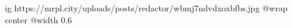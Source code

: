  
 
 
 
 

\ifcmt
  ig https://mrpl.city/uploads/posts/redactor/wbmj7ndvdxoxbfbs.jpg
  @wrap center
  @width 0.6
\fi
